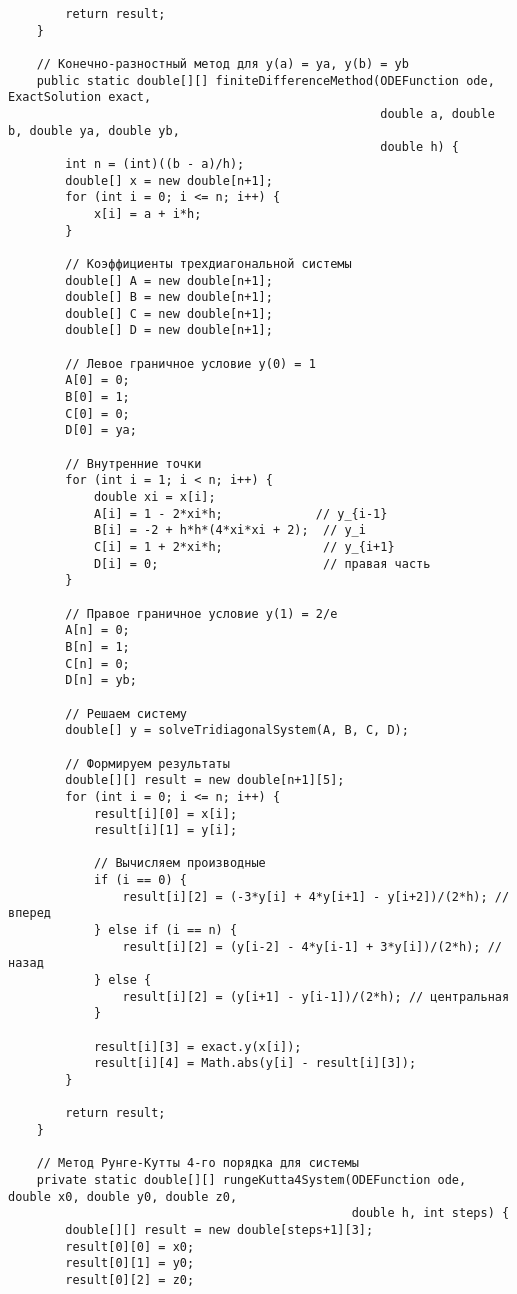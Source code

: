 \begin{verbatim}
        return result;
    }

    // Конечно-разностный метод для y(a) = ya, y(b) = yb
    public static double[][] finiteDifferenceMethod(ODEFunction ode, ExactSolution exact,
                                                    double a, double b, double ya, double yb,
                                                    double h) {
        int n = (int)((b - a)/h);
        double[] x = new double[n+1];
        for (int i = 0; i <= n; i++) {
            x[i] = a + i*h;
        }

        // Коэффициенты трехдиагональной системы
        double[] A = new double[n+1];
        double[] B = new double[n+1];
        double[] C = new double[n+1];
        double[] D = new double[n+1];

        // Левое граничное условие y(0) = 1
        A[0] = 0;
        B[0] = 1;
        C[0] = 0;
        D[0] = ya;

        // Внутренние точки
        for (int i = 1; i < n; i++) {
            double xi = x[i];
            A[i] = 1 - 2*xi*h;             // y_{i-1}
            B[i] = -2 + h*h*(4*xi*xi + 2);  // y_i
            C[i] = 1 + 2*xi*h;              // y_{i+1}
            D[i] = 0;                       // правая часть
        }

        // Правое граничное условие y(1) = 2/e
        A[n] = 0;
        B[n] = 1;
        C[n] = 0;
        D[n] = yb;

        // Решаем систему
        double[] y = solveTridiagonalSystem(A, B, C, D);

        // Формируем результаты
        double[][] result = new double[n+1][5];
        for (int i = 0; i <= n; i++) {
            result[i][0] = x[i];
            result[i][1] = y[i];

            // Вычисляем производные
            if (i == 0) {
                result[i][2] = (-3*y[i] + 4*y[i+1] - y[i+2])/(2*h); // вперед
            } else if (i == n) {
                result[i][2] = (y[i-2] - 4*y[i-1] + 3*y[i])/(2*h); // назад
            } else {
                result[i][2] = (y[i+1] - y[i-1])/(2*h); // центральная
            }

            result[i][3] = exact.y(x[i]);
            result[i][4] = Math.abs(y[i] - result[i][3]);
        }

        return result;
    }

    // Метод Рунге-Кутты 4-го порядка для системы
    private static double[][] rungeKutta4System(ODEFunction ode, double x0, double y0, double z0,
                                                double h, int steps) {
        double[][] result = new double[steps+1][3];
        result[0][0] = x0;
        result[0][1] = y0;
        result[0][2] = z0;


\end{verbatim}
